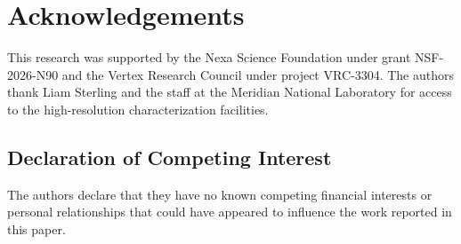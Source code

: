 \section{Acknowledgements}
This research was supported by the Nexa Science Foundation under grant NSF-2026-N90 and the Vertex Research Council under project VRC-3304. The authors thank Liam Sterling and the staff at the Meridian National Laboratory for access to the high-resolution characterization facilities.

\subsection*{Declaration of Competing Interest}
The authors declare that they have no known competing financial interests or personal relationships that could have appeared to influence the work reported in this paper.
